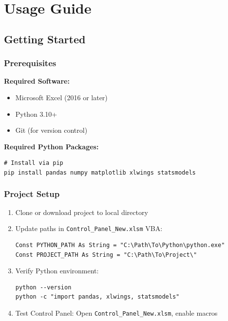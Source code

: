 \chapter{Usage Guide}

\section{Getting Started}

\subsection{Prerequisites}

\textbf{Required Software:}
\begin{itemize}
    \item Microsoft Excel (2016 or later)
    \item Python 3.10+
    \item Git (for version control)
\end{itemize}

\textbf{Required Python Packages:}
\begin{lstlisting}[style=pythonstyle]
# Install via pip
pip install pandas numpy matplotlib xlwings statsmodels
\end{lstlisting}

\subsection{Project Setup}

\begin{enumerate}
    \item Clone or download project to local directory
    \item Update paths in \texttt{Control\_Panel\_New.xlsm} VBA:
    \begin{lstlisting}[style=vbastyle]
Const PYTHON_PATH As String = "C:\Path\To\Python\python.exe"
Const PROJECT_PATH As String = "C:\Path\To\Project\"
    \end{lstlisting}
    
    \item Verify Python environment:
    \begin{lstlisting}
python --version
python -c "import pandas, xlwings, statsmodels"
    \end{lstlisting}
    
    \item Test Control Panel: Open \texttt{Control\_Panel\_New.xlsm}, enable macros
\end{enumerate}

